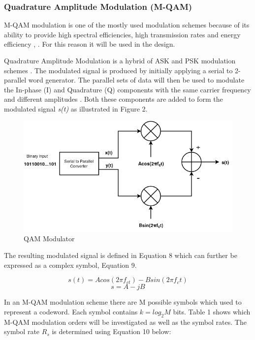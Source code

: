 \documentclass[pdftex,11pt,a4paper]{article}
\begin{document}
\subsubsection{Quadrature Amplitude Modulation (M-QAM)}
M-QAM modulation is one of the mostly used modulation schemes because of its ability to provide high spectral efficiencies, high transmission rates and energy efficiency \cite{65_10}, \cite{65_11}. For this reason it will be used in the design.

Quadrature Amplitude Modulation is a hybrid of ASK and PSK modulation schemes \cite{unknownBook}. The modulated signal is produced by initially applying a serial to 2-parallel word generator. The parallel sets of data will then be used to modulate the In-phase (I) and Quadrature (Q) components with the same carrier frequency and different amplitudes \cite{65}. Both these components are added to form the modulated signal \textit{s(t)} as illustrated in Figure 2.

\begin{figure}[h!]
	\centering
	\includegraphics[scale=0.53]{QAM.png}
	\caption{QAM Modulator}
	\label{fig:1}
\end{figure}{}

The resulting modulated signal is defined in Equation 8 which can further be expressed as a complex symbol, Equation 9.

\begin{equation}
	s(t) = Acos(2\pi f_{ct}) - Bsin(2\pi f_{c}t)
\end{equation}
\begin{equation}
s = A - jB
\end{equation}

In an M-QAM modulation scheme there are M possible symbols which used to represent a codeword. Each symbol contains \(k = log_{2}M\) bits. Table 1 shows which M-QAM modulation orders will be investigated as well as the symbol rates. The symbol rate \(R_s\) is determined using Equation 10 below:
\end{document}
